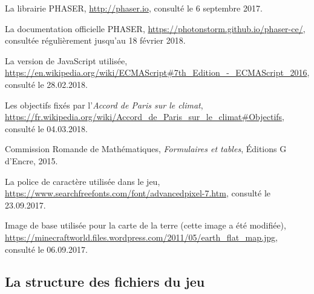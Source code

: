 \documentclass{article}
\begin{document}
        \newpage
        \begin{thebibliography}{9}

  			La librairie PHASER,
  			\url{http://phaser.io},
  			consulté le 6 septembre 2017.
  			
  			La documentation officielle PHASER,
  			\url{https://photonstorm.github.io/phaser-ce/},
  			consultée régulièrement jusqu'au 18 février 2018.
  			
  			La version de JavaScript utilisée,
  			\url{https://en.wikipedia.org/wiki/ECMAScript#7th_Edition_-_ECMAScript_2016},
  			consulté le 28.02.2018.
  			
  			Les objectifs fixés par l'\textit{Accord de Paris sur le climat},
  			\url{https://fr.wikipedia.org/wiki/Accord_de_Paris_sur_le_climat#Objectifs},
  			consulté le 04.03.2018.
  			
  			Commission Romande de Mathématiques, 
  			\textit{Formulaires et tables},
  			Éditions G d'Encre,
  			2015.
  			
  			La police de caractère utilisée dans le jeu,
  			\url{https://www.searchfreefonts.com/font/advancedpixel-7.htm},
  			consulté le 23.09.2017.
  			
  			Image de base utilisée pour la carte de la terre (cette image a été modifiée),
  			\url{https://minecraftworld.files.wordpress.com/2011/05/earth_flat_map.jpg},
  			consulté le 06.09.2017.
 			
		\end{thebibliography}
		
		\begin{appendices}
			\section{La structure des fichiers du jeu} \label{structure}
		\end{appendices}
\end{document}
